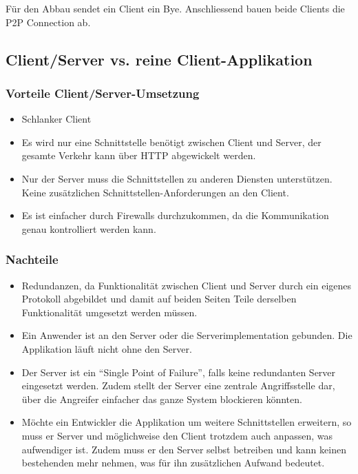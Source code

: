 	Für den Abbau sendet ein Client ein Bye. Anschliessend bauen beide Clients die
	P2P Connection ab.
	
	
	\subsection{Client/Server vs. reine Client-Applikation}
		\subsubsection{Vorteile Client/Server-Umsetzung}
		\begin{itemize}
			\item Schlanker Client
			\item Es wird nur eine Schnittstelle benötigt zwischen Client und Server, der gesamte Verkehr kann über HTTP abgewickelt werden.
			\item Nur der Server muss die Schnittstellen zu anderen Diensten
			unterstützen. Keine zusätzlichen Schnittstellen-Anforderungen an den Client.
			\item Es ist einfacher durch Firewalls durchzukommen, da die Kommunikation genau kontrolliert werden kann.
		\end{itemize}
		\subsubsection{Nachteile}
		\begin{itemize}
			\item Redundanzen, da Funktionalität zwischen Client und Server durch
			ein eigenes Protokoll abgebildet und damit auf beiden Seiten Teile derselben
			Funktionalität umgesetzt werden müssen.
			\item Ein Anwender ist an den Server oder die Serverimplementation gebunden.
			Die Applikation läuft nicht ohne den Server.
			\item Der Server ist ein "`Single Point of Failure"', falls keine redundanten Server eingesetzt werden. Zudem stellt der Server eine zentrale Angriffsstelle dar, über die Angreifer einfacher das ganze System blockieren könnten.
			\item Möchte ein Entwickler die Applikation um weitere Schnittstellen
			erweitern, so muss er Server und möglichweise den Client trotzdem auch
			anpassen, was aufwendiger ist. Zudem muss er den Server selbst betreiben und
			kann keinen bestehenden mehr nehmen, was für ihn zusätzlichen Aufwand
			bedeutet.
		\end{itemize}


